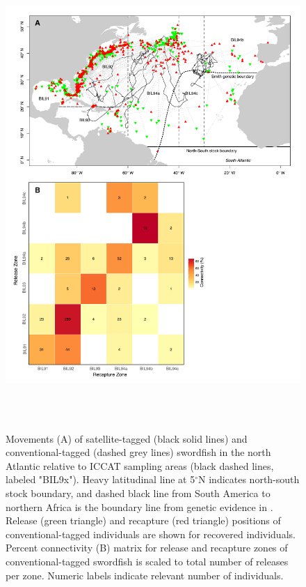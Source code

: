 \begin{figure}[htbp]
\centering
\includegraphics[height=7in, keepaspectratio]{images/C4_Fig3.pdf}
\caption[Movements and connectivity of tagged swordfish in the North Alantic compared to management areas]{Movements (A) of satellite-tagged (black solid lines) and conventional-tagged (dashed grey lines) swordfish in the north Atlantic relative to ICCAT sampling areas (black dashed lines, labeled "BIL9x"). Heavy latitudinal line at 5$^\circ$N indicates north-south stock boundary, and dashed black line from South America to northern Africa is the boundary line from genetic evidence in \citet{Smith2015}. Release (green triangle) and recapture (red triangle) positions of conventional-tagged individuals are shown for recovered individuals. Percent connectivity (B) matrix for release and recapture zones of conventional-tagged swordfish is scaled to total number of releases per zone. Numeric labels indicate relevant number of individuals.}
\label{fig:c4f3}
\end{figure}

